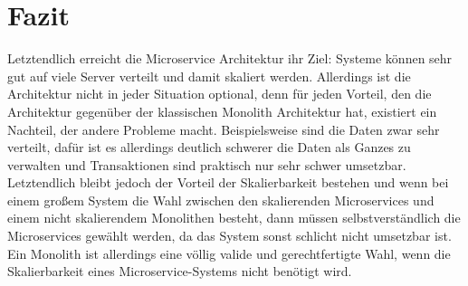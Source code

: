 \chapter{Fazit}

Letztendlich erreicht die Microservice Architektur ihr Ziel: Systeme können sehr gut auf viele Server verteilt und damit skaliert werden. Allerdings ist die Architektur nicht in jeder Situation optional, denn für jeden Vorteil, den die Architektur gegenüber der klassischen Monolith Architektur hat, existiert ein Nachteil, der andere Probleme macht. Beispielsweise sind die Daten zwar sehr verteilt, dafür ist es allerdings deutlich schwerer die Daten als Ganzes zu verwalten und Transaktionen sind praktisch nur sehr schwer umsetzbar. Letztendlich bleibt jedoch der Vorteil der Skalierbarkeit bestehen und wenn bei einem großem System die Wahl zwischen den skalierenden Microservices und einem nicht skalierendem Monolithen besteht, dann müssen selbstverständlich die Microservices gewählt werden, da das System sonst schlicht nicht umsetzbar ist. Ein Monolith ist allerdings eine völlig valide und gerechtfertigte Wahl, wenn die Skalierbarkeit eines Microservice-Systems nicht benötigt wird.

